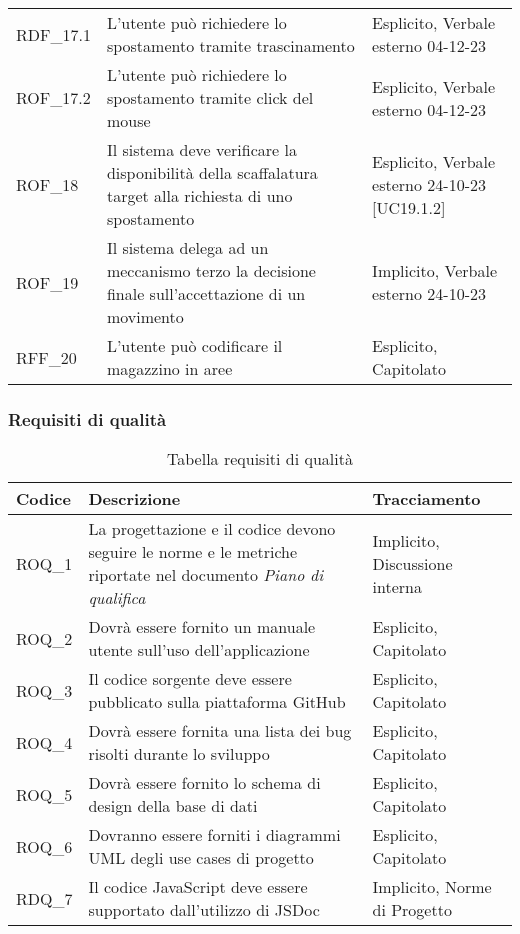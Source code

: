 \begin{xltabular}{\textwidth}{ p{0.1\textwidth} | X | p{0.3\textwidth} }
    RDF\_17.1 & L'utente può richiedere lo spostamento tramite trascinamento & Esplicito, Verbale esterno 04-12-23\\
    ROF\_17.2 & L'utente può richiedere lo spostamento tramite click del mouse & Esplicito, Verbale esterno 04-12-23\\
    ROF\_18 & Il sistema deve verificare la disponibilità della scaffalatura target alla richiesta di uno spostamento & Esplicito, Verbale esterno 24-10-23 [UC19.1.2]\\
    ROF\_19 & Il sistema delega ad un meccanismo terzo la decisione finale sull'accettazione di un movimento & Implicito, Verbale esterno 24-10-23\\
    RFF\_20 & L'utente può codificare il magazzino in aree & Esplicito, Capitolato \\
    \hline
\end{xltabular}


\subsubsection{Requisiti di qualità}\label{subsec:requisiti_qualita}
\begin{xltabular}{\textwidth}{ p{0.1\textwidth} | X | p{0.3\textwidth} }
    \textbf{\color{white} Codice} & \textbf{\color{white} Descrizione} & \textbf{\color{white} Tracciamento} \\ 
    \endhead

    \caption{Tabella requisiti di qualità}
    \endlastfoot

    ROQ\_1 & La progettazione e il codice devono seguire le norme e le metriche riportate nel documento \textit{Piano di qualifica} & Implicito, Discussione interna \\
    ROQ\_2 & Dovrà essere fornito un manuale utente sull'uso dell'applicazione & Esplicito, Capitolato \\
    ROQ\_3 & Il codice sorgente deve essere pubblicato sulla piattaforma GitHub & Esplicito, Capitolato \\
    ROQ\_4 & Dovrà essere fornita una lista dei bug risolti durante lo sviluppo & Esplicito, Capitolato \\ 
    ROQ\_5 & Dovrà essere fornito lo schema di design della base di dati & Esplicito, Capitolato \\ 
    ROQ\_6 & Dovranno essere forniti i diagrammi UML degli use cases di progetto & Esplicito, Capitolato \\ 
    RDQ\_7 & Il codice JavaScript deve essere supportato dall'utilizzo di JSDoc & Implicito, Norme di Progetto \\
    \hline
\end{xltabular}


